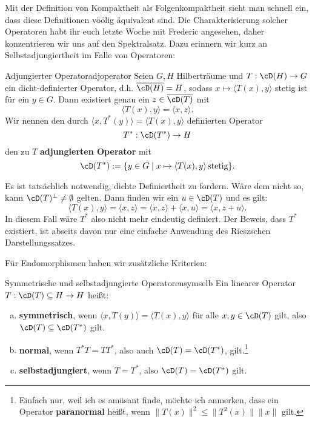 Mit der Definition von Kompaktheit als Folgenkompaktheit sieht man schnell ein, dass diese Definitionen vöölig äquivalent sind. Die Charakterisierung solcher Operatoren habt ihr euch letzte Woche mit Frederic angesehen, daher konzentrieren wir uns auf den Spektralsatz. Dazu erinnern wir kurz an Selbstadjungiertheit im Falle von Operatoren:

\begin{satz}{Adjungierter Operator}{adjoperator}
Seien $G, H$ Hilberträume und $T: \cD(H) \to G$ ein dicht-definierter Operator, d.h. $\overline{\cD(H)}=H$, sodass $x \mapsto \langle T(x),y \rangle$ stetig ist für ein $y \in G$. Dann existiert genau ein $z \in \overline{\cD(T)}$ mit  
\[ \langle T(x), y \rangle = \langle x, z \rangle. \] 
Wir nennen den durch $\langle x, T^\ast(y) \rangle = \langle T(x), y \rangle$ definierten Operator \[T^\ast: \cD(T^\ast) \to H\] den zu $T$ \textbf{adjungierten Operator} mit
\[ \cD(T^\ast) := \{ y \in G \mid x \mapsto \langle T(x), y \rangle \, \text{stetig}\} .\]
\end{satz}

\begin{bemerkung}
Es ist tatsächlich notwendig, dichte Definiertheit zu fordern. Wäre dem nicht so, kann $\cD(T)^\perp \neq \emptyset$ gelten. Dann finden wir ein $u \in \cD(T)$ und es gilt:
\[ \langle T(x), y \rangle = \langle x, z \rangle = \langle x, z \rangle + \langle x, u \rangle = \langle x, z+u \rangle.\]
In diesem Fall wäre $T^\ast$ also nicht mehr eindeutig definiert. Der Beweis, dass $T^\ast$ existiert, ist abseits davon nur eine einfache Anwendung des Rieszschen Darstellungssatzes.
\end{bemerkung}

Für Endomorphismen haben wir zusätzliche Kriterien:
\begin{definition}{Symmetrische und selbstadjungierte Operatoren}{symselb}
Ein linearer Operator $T: \cD(T) \sub H \to H$ heißt:
\begin{enumerate}[(a)]
\item \textbf{symmetrisch}, wenn $\langle x, T(y) \rangle = \langle T(x), y \rangle$ für alle $x,y \in \cD(T)$ gilt, also $\cD(T) \sub \cD(T^\ast)$ gilt.
\item \textbf{normal}, wenn $T^\ast T = T T^\ast$, also auch $\cD(T)=\cD(T^\ast)$, gilt.\footnote{Einfach nur, weil ich es amüsant finde, möchte ich anmerken, dass ein Operator \textbf{paranormal} heißt, wenn $\|T(x)\|^2 \leq \|T^2(x)\| \|x\|$ gilt.}
\item \textbf{selbstadjungiert}, wenn $T= T^\ast$, also $\cD(T)=\cD(T^\ast)$  gilt.
\end{enumerate}
\end{definition}

